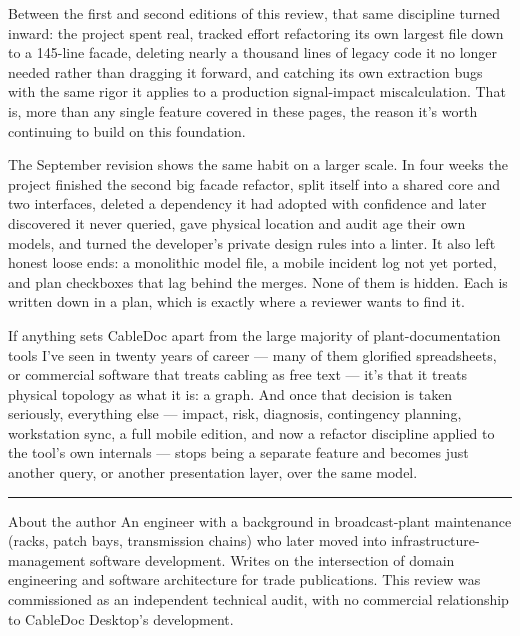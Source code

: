 \documentclass[10.4pt,twocolumn]{article}
\begin{document}
Between the first and second editions of this review, that same discipline turned inward: the project spent real, tracked effort refactoring its own largest file down to a 145-line facade, deleting nearly a thousand lines of legacy code it no longer needed rather than dragging it forward, and catching its own extraction bugs with the same rigor it applies to a production signal-impact miscalculation. That is, more than any single feature covered in these pages, the reason it's worth continuing to build on this foundation.

The September revision shows the same habit on a larger scale. In four weeks the project finished the second big facade refactor, split itself into a shared core and two interfaces, deleted a dependency it had adopted with confidence and later discovered it never queried, gave physical location and audit age their own models, and turned the developer's private design rules into a linter. It also left honest loose ends: a monolithic model file, a mobile incident log not yet ported, and plan checkboxes that lag behind the merges. None of them is hidden. Each is written down in a plan, which is exactly where a reviewer wants to find it.

If anything sets CableDoc apart from the large majority of plant-documentation tools I've seen in twenty years of career --- many of them glorified spreadsheets, or commercial software that treats cabling as free text --- it's that it treats physical topology as what it is: a graph. And once that decision is taken seriously, everything else --- impact, risk, diagnosis, contingency planning, workstation sync, a full mobile edition, and now a refactor discipline applied to the tool's own internals --- stops being a separate feature and becomes just another query, or another presentation layer, over the same model.

\vspace{0.5em}
\noindent\textcolor{BDrule}{\rule{\linewidth}{0.6pt}}

\vspace{0.35em}
\begin{specbox}{About the author}
An engineer with a background in broadcast-plant maintenance (racks, patch bays, transmission chains) who later moved into infrastructure-management software development. Writes on the intersection of domain engineering and software architecture for trade publications. This review was commissioned as an independent technical audit, with no commercial relationship to CableDoc Desktop's development.
\end{specbox}
\end{document}
